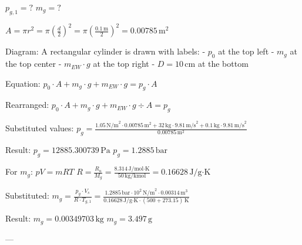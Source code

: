 \( p_{g,1} = ? \)  
\( m_{g} = ? \)  

\( A = \pi r^2 = \pi \left( \frac{d}{2} \right)^2 = \pi \left( \frac{0.1 \, \text{m}}{2} \right)^2 = 0.00785 \, \text{m}^2 \)  

Diagram: A rectangular cylinder is drawn with labels:  
- \( p_0 \) at the top left  
- \( m_{g} \) at the top center  
- \( m_{EW} \cdot g \) at the top right  
- \( D = 10 \, \text{cm} \) at the bottom  

Equation:  
\( p_0 \cdot A + m_{g} \cdot g + m_{EW} \cdot g = p_{g} \cdot A \)  

Rearranged:  
\( p_0 \cdot A + m_{g} \cdot g + m_{EW} \cdot g \div A = p_{g} \)  

Substituted values:  
\( p_{g} = \frac{1.05 \, \text{N/m}^2 \cdot 0.00785 \, \text{m}^2 + 32 \, \text{kg} \cdot 9.81 \, \text{m/s}^2 + 0.1 \, \text{kg} \cdot 9.81 \, \text{m/s}^2}{0.00785 \, \text{m}^2} \)  

Result:  
\( p_{g} = 12885.300739 \, \text{Pa} \)  
\( p_{g} = 1.2885 \, \text{bar} \)  

For \( m_{g} \):  
\( pV = mRT \)  
\( R = \frac{R_u}{M_g} = \frac{8.314 \, \text{J/mol·K}}{50 \, \text{kg/kmol}} = 0.16628 \, \text{J/g·K} \)  

Substituted:  
\( m_{g} = \frac{p_{g} \cdot V_s}{R \cdot T_{g,1}} = \frac{1.2885 \, \text{bar} \cdot 10^2 \, \text{N/m}^2 \cdot 0.00314 \, \text{m}^3}{0.16628 \, \text{J/g·K} \cdot (500 + 273.15) \, \text{K}} \)  

Result:  
\( m_{g} = 0.00349703 \, \text{kg} \)  
\( m_{g} = 3.497 \, \text{g} \)  

---